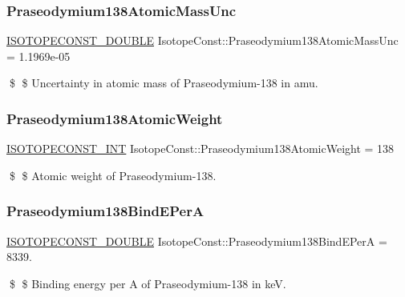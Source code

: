 \subsubsection{\texorpdfstring{Praseodymium138\+Atomic\+Mass\+Unc}{Praseodymium138AtomicMassUnc}}
{\footnotesize\ttfamily \mbox{\hyperlink{group___isotope_const-_macros_ga8f45a7272ce02c0b4c65c44636ed719a}{I\+S\+O\+T\+O\+P\+E\+C\+O\+N\+S\+T\+\_\+\+D\+O\+U\+B\+LE}} Isotope\+Const\+::\+Praseodymium138\+Atomic\+Mass\+Unc = 1.\+1969e-\/05}

\$ \$ Uncertainty in atomic mass of Praseodymium-\/138 in amu. \mbox{\label{group___isotope_const-_praseodymium-_pr138_ga2f8aad02fad7630e61d4ecb222195e3f}} 
\subsubsection{\texorpdfstring{Praseodymium138\+Atomic\+Weight}{Praseodymium138AtomicWeight}}
{\footnotesize\ttfamily \mbox{\hyperlink{group___isotope_const-_macros_ga5f18360b3e99483a35c32d789e62621c}{I\+S\+O\+T\+O\+P\+E\+C\+O\+N\+S\+T\+\_\+\+I\+NT}} Isotope\+Const\+::\+Praseodymium138\+Atomic\+Weight = 138}

\$ \$ Atomic weight of Praseodymium-\/138. \mbox{\label{group___isotope_const-_praseodymium-_pr138_ga427fd9f2e587e1c97ae90cfc7059c3e1}} 
\subsubsection{\texorpdfstring{Praseodymium138\+Bind\+E\+PerA}{Praseodymium138BindEPerA}}
{\footnotesize\ttfamily \mbox{\hyperlink{group___isotope_const-_macros_ga8f45a7272ce02c0b4c65c44636ed719a}{I\+S\+O\+T\+O\+P\+E\+C\+O\+N\+S\+T\+\_\+\+D\+O\+U\+B\+LE}} Isotope\+Const\+::\+Praseodymium138\+Bind\+E\+PerA = 8339.}

\$ \$ Binding energy per A of Praseodymium-\/138 in keV. \mbox{\label{group___isotope_const-_praseodymium-_pr138_gaea243280a0e30badcb25a6fd603f9291}} 
